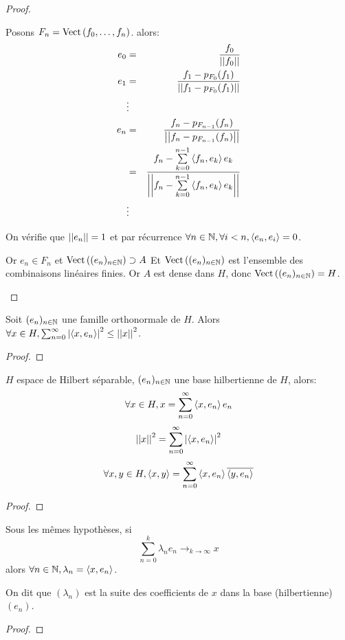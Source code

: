 \begin{proof}
\begin{itemize}
		      Posons $F_n = \text{Vect}\left( f_0, \dots, f_n \right)$.
		      alors:
		      \begin{eqnarray*}
			      e_0 &=& \frac {f_0} {\left|\left|f_0\right|\right|} \\
			      e_1 &=& \frac {f_1 - p_{F_0} (f_1)} {\left|\left|f_1 - p_{F_0} (f_1)\right|\right|} \\
			      &\vdots& \\
			      e_n &=& \frac {f_n - p_{F_{n-1}} (f_n)} {\left|\left|f_n - p_{F_{n-1}} (f_n)\right|\right|}\\
			      &=& \frac {f_n - \sum\limits_{k=0}^{n-1} \left\langle f_n, e_k \right\rangle e_k} {\left|\left|f_n - \sum\limits_{k=0}^{n-1} \left\langle f_n, e_k \right\rangle e_k\right|\right|} \\
			      &\vdots&
		      \end{eqnarray*}

		      On vérifie que $\left|\left|e_n\right|\right| = 1$ et par récurrence $\forall n \in \mathbb{N}, \forall i < n, \left\langle e_n, e_i \right\rangle = 0$.


		      Or $e_n \in F_n$ et $\text{Vect}\left( (e_n)_{n\in \mathbb{N}} \right) \supset A$ Et $\text{Vect}\left( (e_n)_{n\in \mathbb{N}} \right)$ est l'ensemble des combinaisons linéaires finies. Or $A$ est dense dans $H$, donc
		      $\text{Vect}\left( (e_n)_{n\in \mathbb{N}} \right) = H$.
	\end{itemize}
\end{proof}


\begin{prop}
	Soit $(e_n)_{n\in \mathbb{N}}$ une famille orthonormale de $H$.
	Alors $\forall x \in H, \sum_{n=0}^{\infty} \left|\left\langle x, e_n \right\rangle\right|^2 \leq \left|\left|x\right|\right|^2$.
\end{prop}


\begin{proof}
\end{proof}


\begin{prop}
	$H$ espace de Hilbert séparable, $(e_n)_{n\in \mathbb{N}}$ une base hilbertienne de $H$,
	alors:
	$$ \forall x \in H, x = \sum_{n=0}^{\infty} \left\langle x, e_n \right\rangle e_n $$
	$$ {\left|\left|x\right|\right|}^2 = \sum_{n=0}^{\infty} \left|\left\langle x, e_n \right\rangle\right|^2 $$
	$$ \forall x,y \in H, \left\langle x, y \right\rangle = \sum_{n=0}^{\infty} \left\langle x, e_n \right\rangle \overline{\left\langle y, e_n \right\rangle} $$
\end{prop}

\begin{proof}
\end{proof}



\begin{prop}
	Sous les mêmes hypothèses, si
	$$ \sum_{n=0}^{k} \lambda_n e_n \to_{k \to \infty} x $$
	alors $\forall n \in \mathbb{N}, \lambda_n = \left\langle x, e_n \right\rangle$.

	On dit que $(\lambda_n)$ est la suite des coefficients de $x$ dans la base (hilbertienne) $(e_n)$.
\end{prop}


\begin{proof}
\end{proof}

